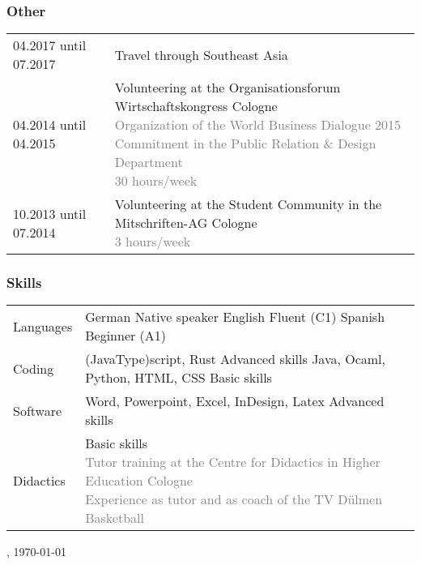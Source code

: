 \subsubsection*{Other}
\begin{table}[h]
  \begin{tabularx}{\textwidth}{@{}p{4cm}X}

    04.2017 until 07.2017 &
    Travel through Southeast Asia \\

    04.2014 until 04.2015 &
    Volunteering at the Organisationsforum Wirtschaftskongress \textbar{} Cologne
    \textcolor{gray}{
      \newline Organization of the World Business Dialogue 2015
      \newline Commitment in the Public Relation \& Design Department
      \newline 30 hours/week} \\

    10.2013 until 07.2014 &
    Volunteering at the Student Community in the Mitschriften-AG \textbar{} Cologne
    \textcolor{gray}{
      \newline 3 hours/week} \\

  \end{tabularx}\label{tab:other}
\end{table}

\subsubsection*{Skills}
\begin{table}[h!]
  \begin{tabularx}{\textwidth}{@{}p{4cm}X}

    Languages &
    German \textbar{} Native speaker
    \newline English \textbar{} Fluent (C1)
    \newline Spanish \textbar{} Beginner (A1) \\

    Coding &
    (Java\textbar{}Type)script, Rust \textbar{} Advanced skills \newline
    Java, Ocaml, Python, HTML, CSS \textbar{} Basic skills \\

    Software &
    Word, Powerpoint, Excel, InDesign, Latex \textbar{} Advanced skills \\

    Didactics &
    Basic skills
    \textcolor{gray}{
      \newline Tutor training at the Centre for Didactics in Higher Education Cologne
      \newline Experience as tutor and as coach of the TV Dülmen Basketball} \\

  \end{tabularx}\label{tab:skills}
\end{table}

\bigskip
\makebox[2.5in]{\hrulefill}\newline{}
\small\city{}, \today{} \\

